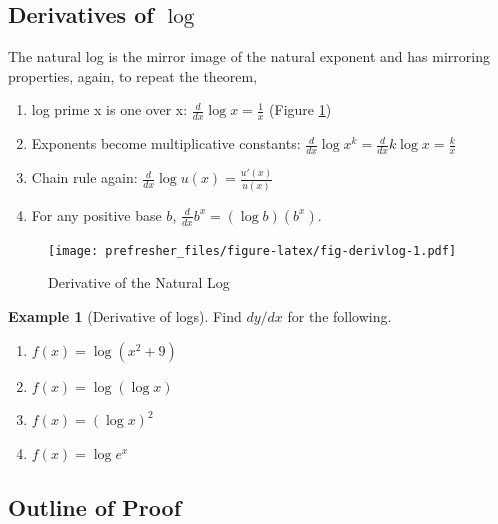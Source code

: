 \documentclass[
]{book}
\providecommand{\tightlist}{%
  \setlength{\itemsep}{0pt}\setlength{\parskip}{0pt}}
\theoremstyle{definition}
\theoremstyle{definition}
\newtheorem{example}{Example}[chapter]
\theoremstyle{definition}
\theoremstyle{remark}
\begin{document}
\hypertarget{derivatives-of-log}{%
\subsection*{\texorpdfstring{Derivatives of \(\log\)}{Derivatives of \textbackslash log}}\label{derivatives-of-log}}

The natural log is the mirror image of the natural exponent and has mirroring properties, again, to repeat the theorem,

\begin{enumerate}
\def\labelenumi{\arabic{enumi}.}
\tightlist
\item
  log prime x is one over x: \(\frac{d}{dx} \log x = \frac{1}{x}\) (Figure \ref{fig:fig-derivlog})
\item
  Exponents become multiplicative constants: \(\frac{d}{dx} \log x^k = \frac{d}{dx} k \log x = \frac{k}{x}\)
\item
  Chain rule again: \(\frac{d}{dx} \log u(x) = \frac{u'(x)}{u(x)}\quad\)
\item
  For any positive base \(b\), \(\frac{d}{dx} b^x = (\log b)\left(b^x\right)\).
\end{enumerate}

\begin{figure}
\centering
\texttt{[image: prefresher\_files/figure-latex/fig-derivlog-1.pdf]}
\caption{\label{fig:fig-derivlog}Derivative of the Natural Log}
\end{figure}

\begin{example}[Derivative of logs]
\protect\hypertarget{exm:exmderivlog}{}{\label{exm:exmderivlog} {} }Find \(dy/dx\) for the following.

\begin{enumerate}
\def\labelenumi{\arabic{enumi}.}
\tightlist
\item
  \(f(x)=\log(x^2+9)\)
\item
  \(f(x)=\log(\log x)\)
\item
  \(f(x)=(\log x)^2\)
\item
  \(f(x)=\log e^x\)
\end{enumerate}
\end{example}

\hypertarget{outline-of-proof}{%
\subsection*{Outline of Proof}\label{outline-of-proof}}
\end{document}
